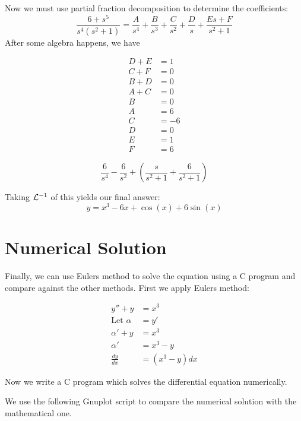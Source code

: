 \documentclass[letterpaper,twocolumn]{article}
\begin{document}
Now we must use partial fraction decomposition to determine the coefficients:
$$
\frac{6 + s^5}{s^4(s^2+1)} = \frac{A}{s^4} + \frac{B}{s^3} + \frac{C}{s^2} + \frac{D}{s} + \frac{Es + F}{s^2+1}
$$
After some algebra happens, we have

\begin{align*}
D + E &= 1 \\
C + F &= 0 \\
B + D &= 0 \\
A + C &= 0 \\
B &= 0 \\
A &= 6 \\
C &= -6 \\
D &= 0 \\
E &= 1 \\
F &= 6
\end{align*}

$$
\frac{6}{s^4} - \frac{6}{s^2} + \left( \frac{s}{s^2 + 1} + \frac{6}{s^2 + 1}\right)
$$

Taking ${\cal L}^{-1}$ of this yields our final answer:
$$
\boxed{y = x^3 - 6x + \cos(x) + 6 \sin(x)}
$$









\section*{Numerical Solution}

Finally, we can use Eulers method to solve the equation using a C program and compare against the other methods.
First we apply Eulers method:

\begin{align*}
y'' + y &= x^3\\
\text{Let } \alpha &= y' \\
\alpha' + y &= x^3 \\
\alpha' &= x^3 - y \\
\frac{dy}{dx} &= (x^3 - y)dx
\end{align*}

Now we write a C program which solves the differential
equation numerically.
\begin{tcolorbox}[breakable, title=\textbf{assignment06.c}]

\end{tcolorbox}

We use the following Gnuplot script to compare the 
numerical solution with the mathematical one.
\begin{tcolorbox}[breakable, title=\textbf{assignment06.gnuplot}]

\end{tcolorbox}
\end{document}
